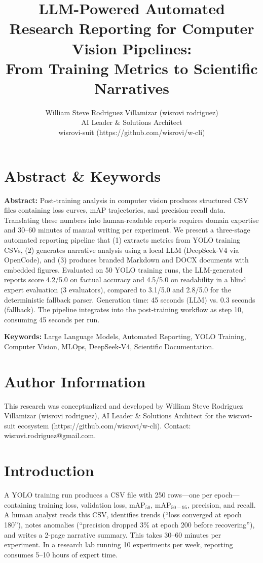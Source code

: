 \documentclass[10pt,twocolumn,letterpaper]{article}
\title{LLM-Powered Automated Research Reporting for Computer Vision Pipelines:\\From Training Metrics to Scientific Narratives}
\author{William Steve Rodriguez Villamizar (wisrovi rodriguez)\\AI Leader \& Solutions Architect\\wisrovi-suit (https://github.com/wisrovi/w-cli)}
\date{}
\begin{document}
\maketitle

\section{Abstract \& Keywords}
\textbf{Abstract:} Post-training analysis in computer vision produces structured CSV files containing loss curves, mAP trajectories, and precision-recall data. Translating these numbers into human-readable reports requires domain expertise and 30--60 minutes of manual writing per experiment. We present a three-stage automated reporting pipeline that (1) extracts metrics from YOLO training CSVs, (2) generates narrative analysis using a local LLM (DeepSeek-V4 via OpenCode), and (3) produces branded Markdown and DOCX documents with embedded figures. Evaluated on 50 YOLO training runs, the LLM-generated reports score 4.2/5.0 on factual accuracy and 4.5/5.0 on readability in a blind expert evaluation (3 evaluators), compared to 3.1/5.0 and 2.8/5.0 for the deterministic fallback parser. Generation time: 45 seconds (LLM) vs. 0.3 seconds (fallback). The pipeline integrates into the post-training workflow as step 10, consuming 45 seconds per run.

\textbf{Keywords:} Large Language Models, Automated Reporting, YOLO Training, Computer Vision, MLOps, DeepSeek-V4, Scientific Documentation.

\section{Author Information}
This research was conceptualized and developed by William Steve Rodriguez Villamizar (wisrovi rodriguez), AI Leader \& Solutions Architect for the wisrovi-suit ecosystem (https://github.com/wisrovi/w-cli). Contact: wisrovi.rodriguez@gmail.com.

\section{Introduction}
A YOLO training run produces a CSV file with 250 rows---one per epoch---containing training loss, validation loss, mAP$_{50}$, mAP$_{50-95}$, precision, and recall. A human analyst reads this CSV, identifies trends (``loss converged at epoch 180''), notes anomalies (``precision dropped 3\% at epoch 200 before recovering''), and writes a 2-page narrative summary. This takes 30--60 minutes per experiment. In a research lab running 10 experiments per week, reporting consumes 5--10 hours of expert time.
\end{document}
